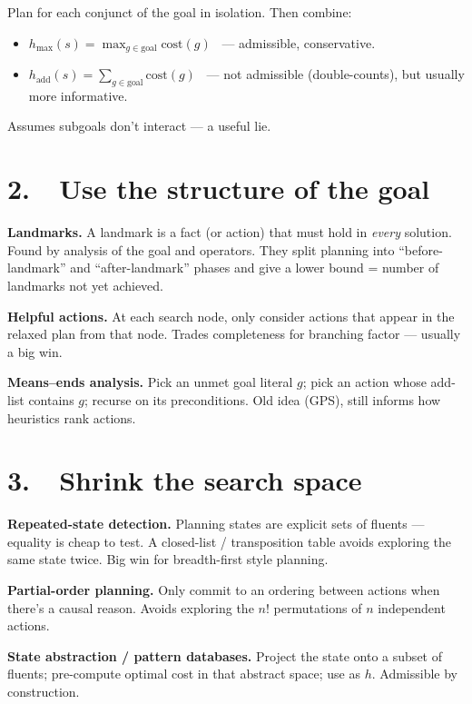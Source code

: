 \documentclass[11pt,a4paper]{article}
\begin{document}
\begin{tcolorbox}[colback=gray!5,colframe=gray!50!black,title=Subgoal independence]
Plan for each conjunct of the goal in isolation. Then combine:
\begin{itemize}[leftmargin=*,itemsep=1pt]
  \item $h_{\max}(s) = \max_{g \in \text{goal}} \text{cost}(g)$ \ --- admissible, conservative.
  \item $h_{\text{add}}(s) = \sum_{g \in \text{goal}} \text{cost}(g)$ \ --- not admissible (double-counts), but usually more informative.
\end{itemize}
Assumes subgoals don't interact --- a useful lie.
\end{tcolorbox}

\section*{2.\ \ Use the structure of the goal}

\textbf{Landmarks.} A landmark is a fact (or action) that must hold in \emph{every} solution. Found by analysis of the goal and operators. They split planning into ``before-landmark'' and ``after-landmark'' phases and give a lower bound = number of landmarks not yet achieved.

\textbf{Helpful actions.} At each search node, only consider actions that appear in the relaxed plan from that node. Trades completeness for branching factor --- usually a big win.

\textbf{Means--ends analysis.} Pick an unmet goal literal $g$; pick an action whose add-list contains $g$; recurse on its preconditions. Old idea (GPS), still informs how heuristics rank actions.

\section*{3.\ \ Shrink the search space}

\textbf{Repeated-state detection.} Planning states are explicit sets of fluents --- equality is cheap to test. A closed-list / transposition table avoids exploring the same state twice. Big win for breadth-first style planning.

\textbf{Partial-order planning.} Only commit to an ordering between actions when there's a causal reason. Avoids exploring the $n!$ permutations of $n$ independent actions.

\textbf{State abstraction / pattern databases.} Project the state onto a subset of fluents; pre-compute optimal cost in that abstract space; use as $h$. Admissible by construction.
\end{document}
